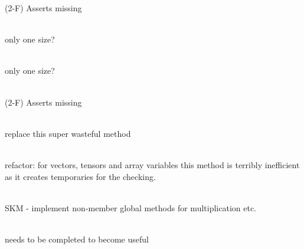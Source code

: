 \begin{DoxyRefList}
\label{todo__todo000153}%
%
(2-\/F) Asserts missing  
\item[Member \doxylink{structcsmp_1_1_local_variable_storage_1_1_data_a5e835489a7b099138cd5cadecf76f5ef}{csmp\+::Local\+Variable\+Storage\texorpdfstring{$<$}{<} dim, STOREE \texorpdfstring{$>$}{>}\+::Data\+::array\+Length} ]\hfill \\
\label{todo__todo000018}%
%
only one size?  
\item[Member \doxylink{structcsmp_1_1_local_variable_storage_1_1_data_a3442a0a37844f158eb9672400345da85}{csmp\+::Local\+Variable\+Storage\texorpdfstring{$<$}{<} dim, STOREE \texorpdfstring{$>$}{>}\+::Data\+::flagged\+Array\+Length} ]\hfill \\
\label{todo__todo000019}%
%
only one size?  
\item[Member \doxylink{classcsmp_1_1_local_variable_storage_a3b56bab7bc4a1db37bfc4d4176457349}{csmp\+::Local\+Variable\+Storage\texorpdfstring{$<$}{<} dim, STOREE \texorpdfstring{$>$}{>}\+::Delete\+Property} (const \doxylink{structcsmp_1_1_index}{csmp\+::\+Index} \&)]\hfill \\
\label{todo__todo000154}%
%
(2-\/F) Asserts missing  
\item[Member \doxylink{classcsmp_1_1_local_variable_storage_aa8f995011429356bfd7e7744794c9b9b}{csmp\+::Local\+Variable\+Storage\texorpdfstring{$<$}{<} dim, STOREE \texorpdfstring{$>$}{>}\+::Is\+Within\+Range} (const \doxylink{structcsmp_1_1_index}{csmp\+::\+Index} \&, double, double) const]\hfill \\
\label{todo__todo000155}%
%
replace this super wasteful method  
\item[Member \doxylink{classcsmp_1_1_local_variable_storage_a19073fdbded1eb2b08e15fc58a6d42ad}{csmp\+::Local\+Variable\+Storage\texorpdfstring{$<$}{<} dim, STOREE \texorpdfstring{$>$}{>}\+::Is\+Within\+Range} (uint32\+\_\+t sector\+\_\+or\+\_\+facet, uint32\+\_\+t ip, const \doxylink{structcsmp_1_1_index}{csmp\+::\+Index} \&, double, double) const]\hfill \\
\label{todo__todo000156}%
%
refactor\+: for vectors, tensors and array variables this method is terribly inefficient as it creates temporaries for the checking.  
\item[Class \doxylink{classcsmp_1_1_matrix}{csmp\+::Matrix} ]\hfill \\
\label{todo__todo000041}%
%
SKM -\/ implement non-\/member global methods for multiplication etc.  
\item[Class \doxylink{classcsmp_1_1_mesh_iterator}{csmp\+::Mesh\+Iterator\texorpdfstring{$<$}{<} dim, CELL \texorpdfstring{$>$}{>}} ]\hfill \\
\label{todo__todo000157}%
%
needs to be completed to become useful 




\end{DoxyRefList}
